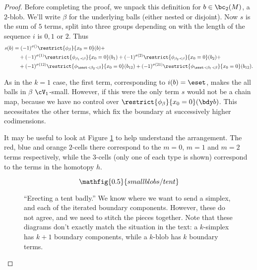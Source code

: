 \begin{proof}
Before completing the proof, we unpack this definition for $b \in \bc_2(M)$, a $2$-blob. We'll write $\beta$ for the underlying balls (either nested or disjoint).
Now $s$ is the sum of $5$ terms, split into three groups depending on with the length of the sequence $i$ is $0, 1$ or $2$. Thus
\begin{align*}
s(b) & = (-1)^{\sigma()} \restrict{\phi_{\beta}}{x_0 = 0}(b) + \\
	& \quad + (-1)^{\sigma(1)}  \restrict{\phi_{\beta_1 \prec \beta}}{x_0 = 0}(b_1) + (-1)^{\sigma(2)} \restrict{\phi_{\beta_2 \prec \beta}}{x_0 = 0}(b_2) + \\
	& \quad + (-1)^{\sigma(12)}  \restrict{\phi_{\eset \prec \beta_2 \prec \beta}}{x_0 = 0}(b_{12}) + (-1)^{\sigma(21)}  \restrict{\phi_{\eset \prec \beta_1 \prec \beta}}{x_0 = 0}(b_{12}).
\end{align*}

As in the $k=1$ case, the first term, corresponding to $i(b) = \eset$, makes the all balls in $\beta$ $\cV_1$-small. However, if this were the only term $s$ would not be a chain map, because we have no control over $\restrict{\phi_{\beta}}{x_0 = 0}(\bdy b)$. This necessitates the other terms, which fix the boundary at successively higher codimensions.

It may be useful to look at Figure \ref{fig:erectly-a-tent-badly} to help understand the arrangement. The red, blue and orange $2$-cells there correspond to the $m=0$, $m=1$ and $m=2$ terms respectively, while the $3$-cells (only one of each type is shown) correspond to the terms in the homotopy $h$.
\begin{figure}[!ht]
$$\mathfig{0.5}{smallblobs/tent}$$
\caption{``Erecting a tent badly.'' We know where we want to send a simplex, and each of the iterated boundary components. However, these do not agree, and we need to stitch the pieces together. Note that these diagrams don't exactly match the situation in the text: a $k$-simplex has $k+1$ boundary components, while a $k$-blob has $k$ boundary terms.}
\label{fig:erectly-a-tent-badly}
\end{figure}


\end{proof}
